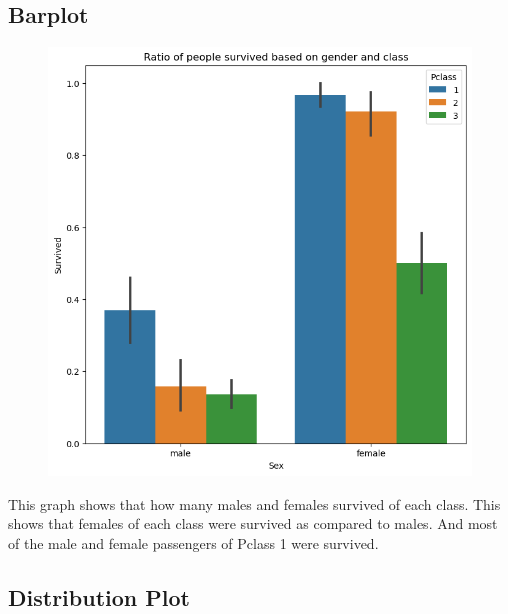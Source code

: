 \documentclass[a4paper, 12pt]{article}
\begin{document}
\subsection*{Barplot}

\begin{figure}[h]
  \centering
  \includegraphics[width=13cm]{barplot.png}
\end{figure}

This graph shows that how many males and females survived of each class. This shows that females of each class were survived as compared to males. And most of the male and female passengers of Pclass 1 were survived.

\subsection*{Distribution Plot}
\end{document}
